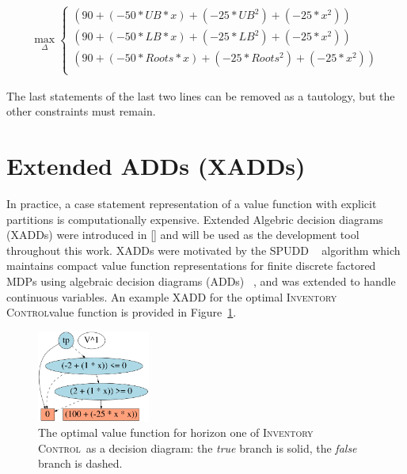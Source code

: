 \documentclass[letterpaper]{article}
\newcommand{\InventoryControl}{\textsc{Inventory Control}}
\begin{document}
\begin{align*}
\max_{\Delta}
\begin{cases}
(90 + (-50 * UB * x) + (-25 *UB ^2) + (-25 * x^2))\\ 
(90 + (-50 * LB * x) + (-25 *LB ^2) + (-25 * x^2))\\ 
(90 + (-50 * Roots * x) + (-25 *Roots ^2) + (-25 * x^2))\\ 
  \end{cases}
\end{align*}

The last statements of the last two lines can be removed as a tautology, but the other constraints must remain.

\section{Extended ADDs (XADDs)}

In practice, a case statement representation of a value function with explicit
partitions is computationally expensive.  
Extended Algebric decision diagrams (XADDs) were introduced in [] and will be used 
as the development tool throughout this work. XADDs were motivated by the SPUDD ~\cite{spudd} algorithm which
maintains compact value function representations for finite discrete
factored MDPs using algebraic decision diagrams (ADDs) ~\cite{bahar93add},
and was extended to handle continuous variables.  An example XADD for the optimal
\InventoryControl value function is provided
in Figure~\ref{fig:rover_R}.

\begin{figure}[t]
\begin{center}
\includegraphics[width=0.33\textwidth]{Figures1/roverR.pdf}
\end{center}
\vspace{-3mm}
\caption{%
The optimal value function for horizon one of \InventoryControl\ 
as a decision diagram: 
the \emph{true} branch is solid, the \emph{false}
branch is dashed.} \label{fig:rover_R}
\vspace{-3mm}
\end{figure}
\end{document}
